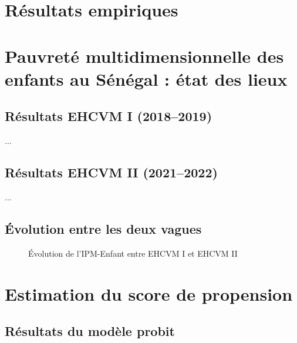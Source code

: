 \section{Résultats empiriques}
\label{chap:resultats}

\section{Pauvreté multidimensionnelle des enfants au Sénégal : état des lieux}

\subsection{Résultats EHCVM I (2018--2019)}

...

\subsection{Résultats EHCVM II (2021--2022)}

...

\subsection{Évolution entre les deux vagues}

\begin{figure}[H]
  \centering
  \caption{Évolution de l'IPM-Enfant entre EHCVM I et EHCVM II}
  \label{fig:evolution_ipm}
\end{figure}

\section{Estimation du score de propension}

\subsection{Résultats du modèle probit}


